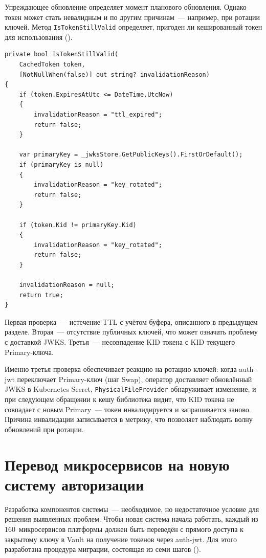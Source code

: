 Упреждающее обновление определяет момент планового обновления.
Однако токен может стать невалидным и по другим причинам~---
например, при ротации ключей.
Метод \texttt{IsTokenStillValid}
определяет, пригоден ли кешированный токен для использования
().

\begin{lstlisting}[language={[Sharp]C}]
private bool IsTokenStillValid(
    CachedToken token,
    [NotNullWhen(false)] out string? invalidationReason)
{
    if (token.ExpiresAtUtc <= DateTime.UtcNow)
    {
        invalidationReason = "ttl_expired";
        return false;
    }

    var primaryKey = _jwksStore.GetPublicKeys().FirstOrDefault();
    if (primaryKey is null)
    {
        invalidationReason = "key_rotated";
        return false;
    }

    if (token.Kid != primaryKey.Kid)
    {
        invalidationReason = "key_rotated";
        return false;
    }

    invalidationReason = null;
    return true;
}
\end{lstlisting}

Первая проверка~--- истечение TTL с учётом буфера,
описанного в предыдущем разделе.
Вторая~--- отсутствие публичных ключей,
что может означать проблему с доставкой JWKS.
Третья~--- несовпадение KID токена с KID текущего Primary-ключа.

Именно третья проверка обеспечивает реакцию на ротацию ключей:
когда auth-jwt переключает Primary-ключ (шаг Swap),
оператор доставляет обновлённый JWKS в Kubernetes Secret,
\texttt{PhysicalFileProvider} обнаруживает изменение,
и при следующем обращении к кешу библиотека видит,
что KID токена не совпадает с новым Primary~---
токен инвалидируется и запрашивается заново.
Причина инвалидации записывается в метрику,
что позволяет наблюдать волну обновлений при ротации.

\section{Перевод микросервисов на новую систему авторизации}\label{sec:migration}

Разработка компонентов системы~--- необходимое,
но недостаточное условие для решения выявленных проблем.
Чтобы новая система начала работать,
каждый из 160~микросервисов платформы должен быть переведён
с прямого доступа к закрытому ключу в Vault
на получение токенов через auth-jwt.
Для этого разработана процедура миграции,
состоящая из семи шагов ().

